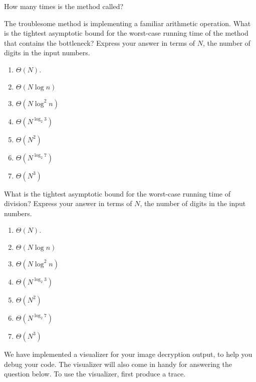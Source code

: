 \documentclass[12pt,twoside]{article}
\begin{document}
\begin{problems}
\begin{problemparts}
\problempart {} How many times is the method called?

\problempart {} The troublesome method is implementing a familiar
arithmetic operation. What is the tightest asymptotic bound for the worst-case
running time of the method that contains the bottleneck? Express your answer in
terms of $N$, the number of digits in the input numbers.
\begin{enumerate}
  \item $\Theta(N)$.
  \item $\Theta(N \log n)$
  \item $\Theta(N \log^2 n)$
  \item $\Theta(N^{\log_{2} 3})$
  \item $\Theta(N^2)$
  \item $\Theta(N^{\log_{2} 7})$
  \item $\Theta(N^3)$
\end{enumerate}

\problempart {} What is the tightest asymptotic bound for the worst-case
running time of division? Express your answer in terms of $N$, the number of
digits in the input numbers.
\begin{enumerate}
  \item $\Theta(N)$.
  \item $\Theta(N \log n)$
  \item $\Theta(N \log^2 n)$
  \item $\Theta(N^{\log_{2} 3})$
  \item $\Theta(N^2)$
  \item $\Theta(N^{\log_{2} 7})$
  \item $\Theta(N^3)$
\end{enumerate}
\end{problemparts}

We have implemented a visualizer for your image decryption output, to help you
debug your code. The visualizer will also come in handy for answering the
question below. To use the visualizer, first produce a trace.


\end{problems}
\end{document}
